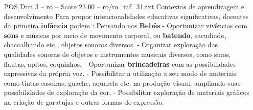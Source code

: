\begin{textsample}{POS Dim 3 – ro – Score 23.00 – ro/ro\_inf\_31.txt}  \label{ex:f3_pos_136}
Contextos de aprendizagem e desenvolvimento Para propor intencionalidades educativas significativas, docentes da primeira \textbf{infância} podem : Pensando nos \textbf{Bebês} - Oportunizar vivências com \textbf{sons} e músicas por meio de movimento corporal, ou \textbf{batendo}, sacudindo, chacoalhando etc., objetos sonoros diversos. - Organizar exploração das qualidades sonoras de objetos e instrumentos musicais diversos, como sinos, flautas, apitos, coquinhos. - Oportunizar \textbf{brincadeiras} com as possibilidades expressivas da própria voz. - Possibilitar a utilização a seu modo de materiais como tintas caseiras, guache, aquarela etc. na produção visual, ampliando suas possibilidades de exploração da cor. - Possibilitar exploração de materiais gráficos na criação de garatujas e outras formas de expressão.

\end{textsample}
